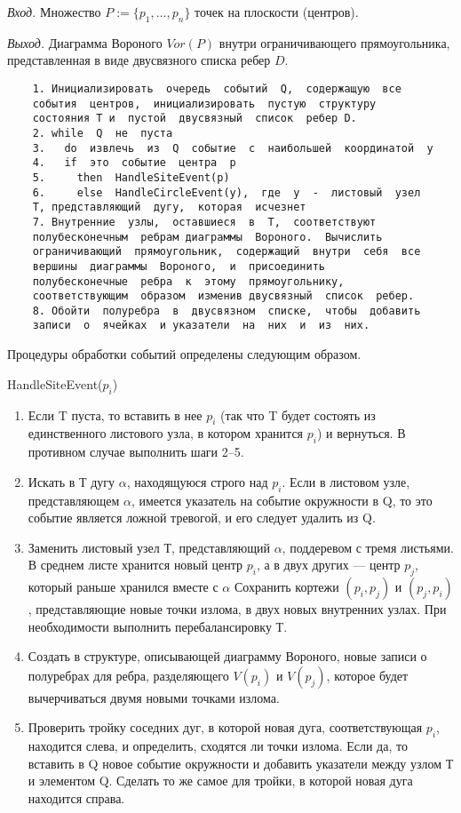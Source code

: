 \textit{Вход.}  Множество  $P :=  \{p_1 , ...,  p_n\}$  точек  на  плоскости  (центров).

\textit{Выход.} Диаграмма  Вороного  $Vor(P)$  внутри  ограничивающего  прямоугольника, представленная  в  виде  двусвязного  списка  ребер $D$.

\begin{verbatim}
	1. Инициализировать  очередь  событий  Q,  содержащую  все
	события  центров,  инициализировать  пустую  структуру
	состояния T и  пустой  двусвязный  список  ребер D.
	2. while  Q  не  пуста
	3.   do  извлечь  из  Q  событие  с  наибольшей  координатой  у
	4.   if  это  событие  центра  р
	5.     then  HandleSiteEvent(p)
	6.     else  HandleCircleEvent(y),  где  у  -  листовый  узел
	Т, представляющий  дугу,  которая  исчезнет
	7. Внутренние  узлы,  оставшиеся  в  T,  соответствуют
	полубесконечным  ребрам диаграммы  Вороного.  Вычислить
	ограничивающий  прямоугольник,  содержащий  внутри  себя  все
	вершины  диаграммы  Вороного,  и  присоединить
	полубесконечные  ребра  к  этому  прямоугольнику,
	соответствующим  образом  изменив двусвязный  список  ребер.
	8. Обойти  полуребра  в  двусвязном  списке,  чтобы  добавить
	записи  о  ячейках  и указатели  на  них  и  из  них.
\end{verbatim}

Процедуры  обработки  событий  определены  следующим  образом.

HandleSiteEvent($p_i$)

\begin{enumerate}
	\item 	Если  T  пуста,  то  вставить  в  нее  $p_i$ (так  что T будет  состоять  из  единственного листового  узла,  в  котором  хранится  $p_i$)  и  вернуться.
	В  противном  случае  выполнить  шаги  2--5.
	\item 	 Искать  в  Т  дугу  $\alpha$,  находящуюся  строго  над  $p_i$.
	Если  в  листовом  узле,  представляющем  $\alpha$,  имеется  указатель  на  событие  окружности  в  Q,  то  это  событие  является  ложной  тревогой,  и  его  следует  удалить  из  Q.
	\item 	 Заменить  листовый  узел  Т,  представляющий  $\alpha$,  поддеревом  с  тремя  листьями. 
	В  среднем  листе  хранится  новый  центр  $p_i$,  а  в  двух  других  ---  центр  $p_j$,  который раньше  хранился  вместе  с  $\alpha$  Сохранить  кортежи  $(p_i, p_j)$  и  $(p_j, p_i)$,  представляющие  новые  точки  излома,  в  двух  новых  внутренних  узлах.
	При  необходимости выполнить  перебалансировку  Т.
	\item 	 Создать  в  структуре,  описывающей  диаграмму  Вороного,  новые  записи  о  полуребрах  для  ребра,  разделяющего  $V(p_i)$  и  $V(p_j)$,  которое  будет  вычерчиваться двумя  новыми  точками  излома.
	\item 	 Проверить  тройку  соседних  дуг,  в  которой  новая  дуга,  соответствующая  $p_i$,  находится  слева,  и  определить,  сходятся  ли  точки  излома.
	Если  да,  то  вставить  в Q  новое  событие  окружности  и  добавить  указатели  между  узлом  Т  и  элементом Q.  
	Сделать  то  же  самое  для  тройки,  в  которой  новая  дуга  находится  справа.
\end{enumerate}

